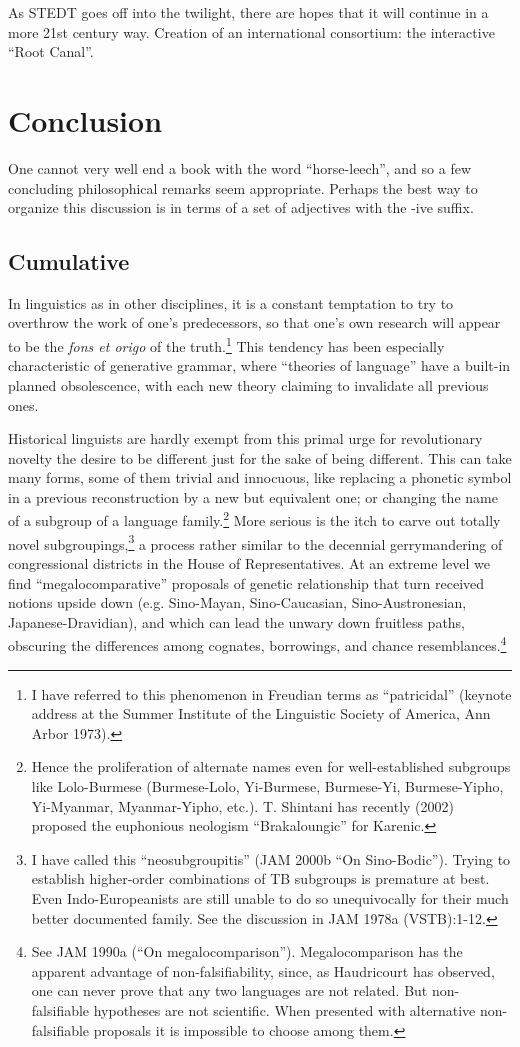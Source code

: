 As STEDT goes off into the twilight, there are hopes that it will continue in a more 21st century way.  Creation of an international consortium: the interactive “Root Canal”.

\section{Conclusion}
One cannot very well end a book with the word ``horse-leech'', and so a few concluding philosophical remarks seem appropriate. Perhaps the best way to organize this discussion is in terms of a set of adjectives with the -ive suffix.

\subsection{Cumulative}

In linguistics as in other disciplines, it is a constant temptation to try to overthrow the work of one's predecessors, so that one's own research will appear to be the {\it fons et origo} of the truth.\footnote{I have referred to this phenomenon in Freudian terms as ``patricidal'' (keynote address at the Summer Institute of the Linguistic Society of America, Ann Arbor 1973).}
This tendency has been especially characteristic of generative grammar, where ``theories of language'' have a built-in planned obsolescence, with each new theory claiming to invalidate all previous ones.

Historical linguists are hardly exempt from this primal urge for revolutionary novelty  the desire to be different just for the sake of being different. This can take many forms, some of them trivial and innocuous, like replacing a phonetic symbol in a previous reconstruction by a new but equivalent one; or changing the name of a subgroup of a language family.\footnote{Hence the proliferation of alternate names even for well-established subgroups like Lolo-Burmese (Burmese-Lolo, Yi-Burmese, Burmese-Yi, Burmese-Yipho, Yi-Myanmar, Myanmar-Yipho, etc.). T. Shintani has recently (2002) proposed the euphonious neologism ``Brakaloungic'' for Karenic.}
More serious is the itch to carve out totally novel subgroupings,\footnote{I have called this ``neosubgroupitis'' (JAM 2000b ``On Sino-Bodic''). Trying to establish higher-order combinations of TB subgroups is premature at best. Even Indo-Europeanists are still unable to do so unequivocally for their much better documented family. See the discussion in JAM 1978a (VSTB):1-12.} a process rather similar to the decennial gerrymandering of congressional districts in the House of Representatives. At an extreme level we find ``megalocomparative'' proposals of genetic relationship that turn received notions upside down (e.g. Sino-Mayan, Sino-Caucasian, Sino-Austronesian, Japanese-Dravidian), and which can lead the unwary down fruitless paths, obscuring the differences among cognates, borrowings, and chance resemblances.\footnote{See JAM 1990a (“On megalocomparison”). Megalocomparison has the apparent advantage of non-falsifiability, since, as Haudricourt has observed, one can never prove that any two languages are not related. But non-falsifiable hypotheses are not scientific. When presented with alternative non-falsifiable proposals it is impossible to choose among them.}

